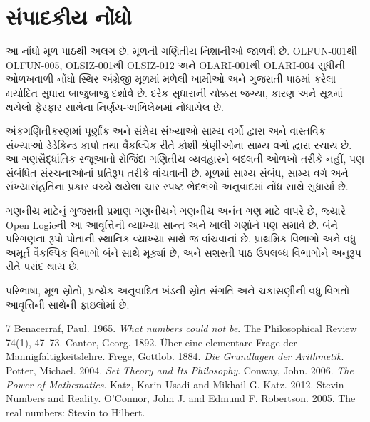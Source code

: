 \section*{સંપાદકીય નોંધો}
આ નોંધો મૂળ પાઠથી અલગ છે. મૂળની ગણિતીય નિશાનીઓ જાળવી છે.
OLFUN-001થી OLFUN-005, OLSIZ-001થી OLSIZ-012 અને OLARI-001થી
OLARI-004 સુધીની ઓળખવાળી નોંધો સ્થિર અંગ્રેજી મૂળમાં મળેલી ખામીઓ અને
ગુજરાતી પાઠમાં કરેલા મર્યાદિત સુધારા બાજુબાજુ દર્શાવે છે. દરેક
સુધારાની ચોક્કસ જગ્યા, કારણ અને સૂત્રમાં થયેલો ફેરફાર સાથેના
નિર્ણય-અભિલેખમાં નોંધાયેલ છે.

અંકગણિતીકરણમાં પૂર્ણાંક અને સંમેય સંખ્યાઓ સામ્ય વર્ગો દ્વારા અને
વાસ્તવિક સંખ્યાઓ ડેડેકિન્ડ કાપો તથા વૈકલ્પિક રીતે કોશી શ્રેણીઓના
સામ્ય વર્ગો દ્વારા રચાય છે. આ ગણસૈદ્ધાંતિક રજૂઆતો રોજિંદા ગણિતીય
વ્યવહારને બદલતી ઓળખો તરીકે નહીં, પણ સંબંધિત સંરચનાઓનાં પ્રતિરૂપ તરીકે
વાંચવાની છે. મૂળમાં સામ્ય સંબંધ, સામ્ય વર્ગ અને સંખ્યાસંહતિના પ્રકાર
વચ્ચે થયેલા ચાર સ્પષ્ટ ભેદભંગો અનુવાદમાં નોંધ સાથે સુધાર્યા છે.

ગણનીય માટેનું ગુજરાતી પ્રમાણ ગણનીયને ગણનીય અનંત ગણ માટે વાપરે છે,
જ્યારે Open Logicની આ આવૃત્તિની વ્યાખ્યા સાન્ત અને ખાલી ગણોને પણ
સમાવે છે. બંને પરિગણના-રૂપો પોતાની સ્થાનિક વ્યાખ્યા સાથે જ વાંચવાનાં છે.
પ્રાથમિક વિભાગો અને વધુ અમૂર્ત વૈકલ્પિક વિભાગો બંને સાથે મૂક્યાં છે,
અને સશરતી પાઠ ઉપલબ્ધ વિભાગોને અનુરૂપ રીતે પસંદ થાય છે.

પરિભાષા, મૂળ સ્રોતો, પ્રત્યેક અનુવાદિત ખંડની સ્રોત-સંગતિ અને
ચકાસણીની વધુ વિગતો આવૃત્તિની સાથેની ફાઇલોમાં છે.
\begin{thebibliography}{7}
Benacerraf, Paul. 1965. \emph{What numbers could not be}.
The Philosophical Review 74(1), 47--73.
Cantor, Georg. 1892. Über eine elementare Frage der Mannigfaltigkeitslehre.
Frege, Gottlob. 1884. \emph{Die Grundlagen der Arithmetik}.
Potter, Michael. 2004. \emph{Set Theory and Its Philosophy}.
Conway, John. 2006. \emph{The Power of Mathematics}.
Katz, Karin Usadi and Mikhail G. Katz. 2012. Stevin Numbers and Reality.
O'Connor, John J. and Edmund F. Robertson. 2005. The real numbers: Stevin to Hilbert.
\end{thebibliography}

